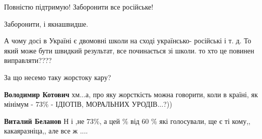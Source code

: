 \begin{itemize}
 
Повністю підтримую! Заборонити все російське!

 
Заборонити, і якнашвидше.

 

А чому досі в Україні є двомовні школи на сході українсько- російські і т. д. То
який може бути швидкий результат, все починається зі школи. то хто це повинен
виправляти????


 
За що несемо таку жорстоку кару?

\begin{itemize}
 
\textbf{Володимир Котович} хм...а, про яку жорсткість можна говорити, коли в країні, як мінімум - 73\% - ІДІОТІВ, МОРАЛЬНИХ УРОДІВ...?))

 
\textbf{Виталий Беланов} Н і ,не 73\%, а цей \% від 60 \% які голосували, ще є ті кому,, какаяразніца,, але все ж ....
\end{itemize}


\end{itemize}

